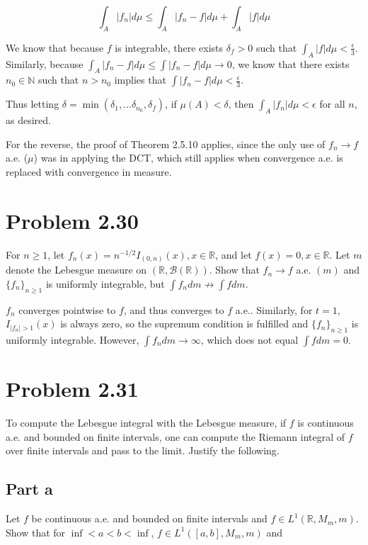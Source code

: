 \documentclass{article}
\newcommand{\R}{\mathbb{R}}
\newcommand{\N}{\mathbb{N}}
\newcommand{\B}{\mathcal{B}}
\begin{document}
\[
\int_A|f_n|d\mu \leq \int_A|f_n-f|d\mu + \int_A|f|d\mu
\]

We know that because $f$ is integrable, there exists $\delta_f>0$ such that $\int_A|f|d\mu < \frac{\epsilon}{3}$. Similarly, because $\int_A|f_n-f|d\mu \leq \int|f_n-f|d\mu \rightarrow 0$, we know that there exists $n_0 \in \N$ such that $n > n_0$ implies that $\int|f_n-f|d\mu < \frac{\epsilon}{3}$.

Thus letting $\delta = \min(\delta_1, \dots \delta_{n_0}, \delta_f)$, if $\mu(A) < \delta$, then $\int_A|f_n|d\mu < \epsilon$ for all $n$, as desired.

For the reverse, the proof of Theorem 2.5.10 applies, since the only use of $f_n \rightarrow f$ a.e. ($\mu$) was in applying the DCT, which still applies when convergence a.e. is replaced with convergence in measure.

\section*{Problem 2.30}

For $n \geq 1$, let $f_n(x) = n^{-1/2}I_{(0,n)}(x), x \in \R$, and let $f(x) = 0, x \in \R$. Let $m$ denote the Lebesgue measure on $(\R, \B(\R))$. Show that $f_n \rightarrow f$ a.e. $(m)$ and $\{f_n\}_{n \geq 1}$ is uniformly integrable, but $\int f_n dm \nrightarrow \int f dm$.

$f_n$ converges pointwise to $f$, and thus converges to $f$ a.e.. Similarly, for $t = 1$, $I_{|f_n| > 1}(x)$ is always zero, so the supremum condition is fulfilled and $\{f_n\}_{n \geq 1}$ is uniformly integrable. However, $\int f_n dm \rightarrow \infty$, which does not equal $\int f dm = 0$.

\section*{Problem 2.31}

To compute the Lebesgue integral with the Lebesgue measure, if $f$ is continuous a.e. and bounded on finite intervals, one can compute the Riemann integral of $f$ over finite intervals and pass to the limit. Justify the following.

\subsection*{Part a}

Let $f$ be continuous a.e. and bounded on finite intervals and $f \in L^1(\R, M_m, m)$. Show that for $\inf < a < b < \inf$, $f \in L^1([a, b], M_m, m)$ and 
\end{document}
